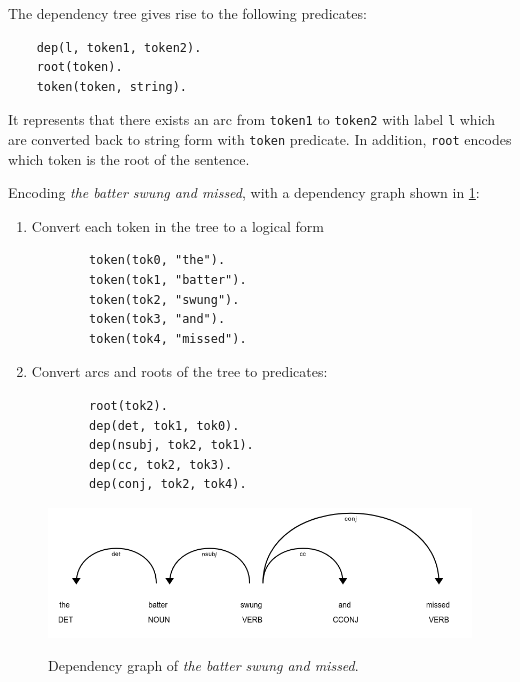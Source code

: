 The dependency tree gives rise to the following predicates:
\begin{verbatim}
    dep(l, token1, token2).
    root(token).
    token(token, string).
\end{verbatim}

It represents that there exists an arc from \verb_token1_ to \verb_token2_ with label \verb+l+ which are converted back to string form with \verb_token_ predicate.
In addition, \verb_root_ encodes which token is the root of the sentence.

\begin{example}
\label{logical-encoding-example}
Encoding \textit{the batter swung and missed}, with a dependency graph shown in \ref{example-dependency-graph}:
\begin{enumerate}
    \item Convert each token in the tree to a logical form
    \begin{verbatim}
        token(tok0, "the").
        token(tok1, "batter").
        token(tok2, "swung").
        token(tok3, "and").
        token(tok4, "missed").
    \end{verbatim}
    \item Convert arcs and roots of the tree to predicates:
    \begin{verbatim}
        root(tok2).
        dep(det, tok1, tok0).
        dep(nsubj, tok2, tok1).
        dep(cc, tok2, tok3).
        dep(conj, tok2, tok4).
    \end{verbatim}
\end{enumerate}
\end{example} 

\begin{figure}[h]
\caption{Dependency graph of \emph{the batter swung and missed}.}
\vspace{10pt}
\centering
\includegraphics[width=\textwidth]{solving-nlp-tasks-logically/example_dependency_tree.png}
\label{example-dependency-graph}
\end{figure}

